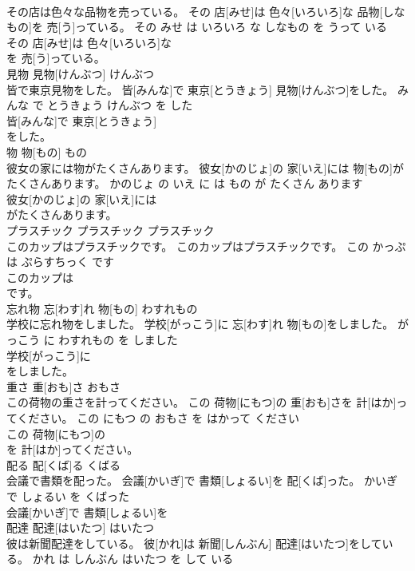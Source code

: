 \documentclass[8pt]{extreport}
\begin{document}
\begin{CJK}{UTF8}{min}
\\	その店は色々な品物を売っている。	その 店[みせ]は 色々[いろいろ]な 品物[しなもの]を 売[う]っている。	その みせ は いろいろ な しなもの を うって いる	
\\	その 店[みせ]は 色々[いろいろ]な
\\	を 売[う]っている。		
\\	見物	見物[けんぶつ]	けんぶつ	
\\	皆で東京見物をした。	皆[みんな]で 東京[とうきょう] 見物[けんぶつ]をした。	みんな で とうきょう けんぶつ を した	
\\	皆[みんな]で 東京[とうきょう]
\\	をした。		
\\	物	物[もの]	もの	
\\	彼女の家には物がたくさんあります。	彼女[かのじょ]の 家[いえ]には 物[もの]がたくさんあります。	かのじょ の いえ に は もの が たくさん あります	
\\	彼女[かのじょ]の 家[いえ]には
\\	がたくさんあります。		
\\	プラスチック	プラスチック	プラスチック	
\\	このカップはプラスチックです。	このカップはプラスチックです。	この かっぷ は ぷらすちっく です	
\\	このカップは
\\	です。		
\\	忘れ物	忘[わす]れ 物[もの]	わすれもの	
\\	学校に忘れ物をしました。	学校[がっこう]に 忘[わす]れ 物[もの]をしました。	がっこう に わすれもの を しました	
\\	学校[がっこう]に
\\	をしました。		
\\	重さ	重[おも]さ	おもさ	
\\	この荷物の重さを計ってください。	この 荷物[にもつ]の 重[おも]さを 計[はか]ってください。	この にもつ の おもさ を はかって ください	
\\	この 荷物[にもつ]の
\\	を 計[はか]ってください。		
\\	配る	配[くば]る	くばる	
\\	会議で書類を配った。	会議[かいぎ]で 書類[しょるい]を 配[くば]った。	かいぎ で しょるい を くばった	
\\	会議[かいぎ]で 書類[しょるい]を
\\	配達	配達[はいたつ]	はいたつ	
\\	彼は新聞配達をしている。	彼[かれ]は 新聞[しんぶん] 配達[はいたつ]をしている。	かれ は しんぶん はいたつ を して いる	

\end{CJK}
\end{document}
